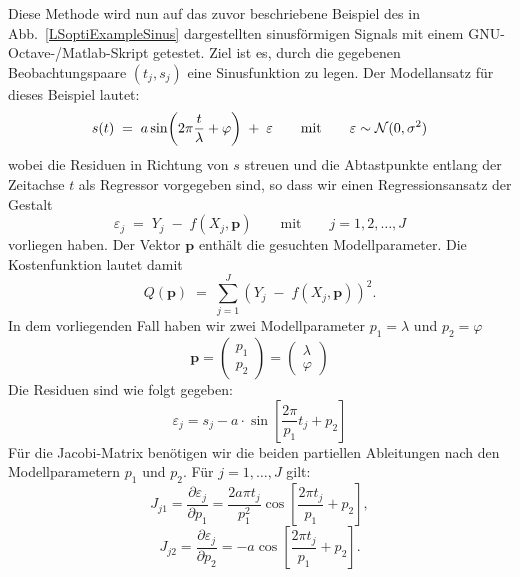 Diese Methode wird nun auf das zuvor beschriebene Beispiel des in Abb.~\ref{LSoptiExampleSinus}
dargestellten sinusförmigen Signals mit einem GNU-Octave-/Matlab-Skript getestet.
Ziel ist es, durch die gegebenen Beobachtungspaare $(t_j,s_j)$ eine Sinusfunktion
zu legen. Der Modellansatz für dieses Beispiel lautet:
\begin{equation}
	s(t) \; = \; a \sin\!\left(2\pi \frac{t}{\lambda} + \varphi\right) \; + \; \varepsilon
	\qquad \textrm{mit} \qquad \varepsilon \sim {\cal N}(0,\sigma^2)
\end{equation}
wobei die Residuen in Richtung von $s$ streuen und die Abtastpunkte
entlang der Zeitachse $t$ als Regressor vorgegeben sind, so dass
wir einen Regressionsansatz der Gestalt
\begin{equation}
	\varepsilon_j \; = \; Y_j \; - \; f(X_j, \boldsymbol{p}) \qquad \textrm{mit} \qquad
	j=1, 2,\dots, J
\end{equation}
vorliegen haben. Der Vektor $\boldsymbol{p}$ enthält die gesuchten Modellparameter. Die
Kostenfunktion lautet damit
\begin{equation}
	Q(\boldsymbol{p}) \; = \; \sum\limits_{j=1}^J \left(Y_j \; - \; f(X_j, \boldsymbol{p})\right)^2.
\end{equation}
In dem vorliegenden Fall haben wir zwei Modellparameter $p_1 = \lambda$ und $p_2 = \varphi$
\begin{equation}
\boldsymbol{p} =
\left(\begin{array}{c}
	p_1 \\
	p_2
\end{array}\right)
= \left(\begin{array}{c}
	\lambda \\
	\varphi
\end{array}\right)
\end{equation}
Die Residuen sind wie folgt gegeben:
\begin{equation}
\varepsilon_j = s_j - a \cdot \sin \left[ \frac{2 \pi}{p_1}t_j +p_2\right]
\end{equation}
Für die Jacobi-Matrix benötigen wir die beiden partiellen Ableitungen nach den
Modellparametern $p_1$ und $p_2$. Für $j=1,\ldots,J$ gilt:
\begin{equation}
J_{j1}=\frac{\partial\varepsilon_j}{\partial p_1}
=\frac{2a\pi t_j}{p_1^2}
\cos\!\left[\frac{2\pi t_j}{p_1}+p_2\right],
\label{eq:JakobiMatrix_J11}
\end{equation}
\begin{equation}
J_{j2}=\frac{\partial\varepsilon_j}{\partial p_2}
=-a\cos\!\left[\frac{2\pi t_j}{p_1}+p_2\right].
\label{eq:JakobiMatrix_J21}
\end{equation}

